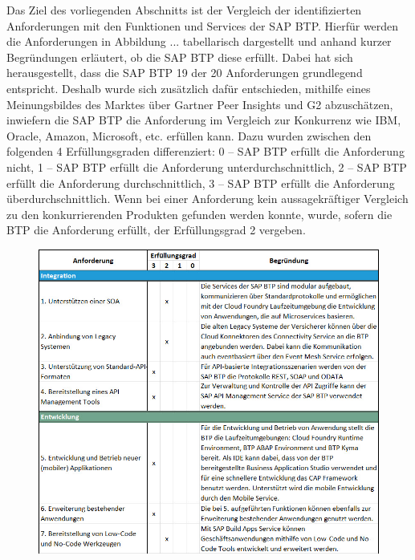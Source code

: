Das Ziel des vorliegenden Abschnitts ist der Vergleich der identifizierten Anforderungen mit den Funktionen und Services der SAP BTP. Hierfür werden die Anforderungen in Abbildung ... tabellarisch dargestellt und anhand kurzer Begründungen erläutert, ob die SAP BTP diese erfüllt. Dabei hat sich herausgestellt, dass die SAP BTP 19 der 20 Anforderungen grundlegend entspricht. Deshalb wurde sich zusätzlich dafür entschieden, mithilfe eines Meinungsbildes des Marktes über Gartner Peer Insights und G2 abzuschätzen, inwiefern die SAP BTP die Anforderung im Vergleich zur Konkurrenz wie IBM, Oracle, Amazon, Microsoft, etc. erfüllen kann. Dazu wurden zwischen den folgenden 4 Erfüllungsgraden differenziert: 0 – SAP BTP erfüllt die Anforderung nicht, 1 – SAP BTP erfüllt die Anforderung unterdurchschnittlich, 2 – SAP BTP erfüllt die Anforderung durchschnittlich, 3 – SAP BTP erfüllt die Anforderung überdurchschnittlich. Wenn bei einer Anforderung kein aussagekräftiger Vergleich zu den konkurrierenden Produkten gefunden werden konnte, wurde, sofern die BTP die Anforderung erfüllt, der Erfüllungsgrad 2 vergeben.

\begin{figure}[ht]
    \centering
    \includegraphics[width=1\textwidth]{img/TTFTeil1E2.jpg}
    \label{fig:TTFTeil1}
\end{figure}


